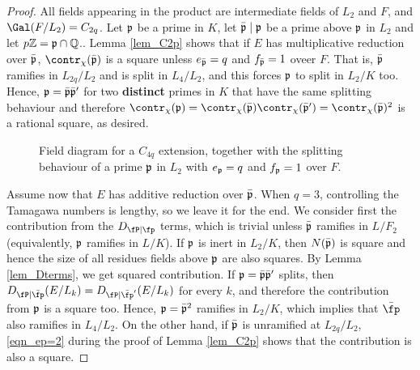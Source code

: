 \begin{proof}
    All fields appearing in the product are intermediate fields of $L_2$ and $F$, and $\Gal(F/L_2)=C_{2q}$. Let $\mathfrak{p}$ be a prime in $K$, let $\bar{\mathfrak{p}}\mid\mathfrak{p}$ be a prime above $\mathfrak{p}$ in $L_2$ and let $p\mathbb{Z}=\mathfrak{p}\cap\mathbb{Q}$.. Lemma \ref{lem_C2p} shows that if $E$ has multiplicative reduction over $\bar{\mathfrak{p}}$, $\contr_\chi(\bar\pp)$ is a square unless $e_{\bar{\mathfrak{p}}}=q$ and $f_{\bar{\mathfrak{p}}}=1$ oveer $F$. That is, $\bar{\mathfrak{p}}$ ramifies in $L_{2q}/L_2$ and is split in $L_4/L_2$, and this forces $\mathfrak{p}$ to split in $L_2/K$ too. Hence, $\mathfrak{p}=\bar{\mathfrak{p}}\bar{\mathfrak{p}}'$ for two \textbf{distinct} primes in $K$ that have the same splitting behaviour and therefore $\contr_\chi(\pp)=\contr_\chi(\bar\pp)\contr_\chi(\bar\pp')=\contr_\chi(\bar\pp)^2$ is a rational square, as desired.

    \begin{figure}[!ht]
        \centering
        \caption[short]{\centering Field diagram for a $C_{4q}$ extension, together with the splitting\\ behaviour of a prime $\mathfrak{p}$ in $L_2$ with $e_{\mathfrak{p}}=q$ and $f_{\mathfrak{p}}=1$ over $F$.}
    \end{figure}

    Assume now that $E$ has additive reduction over $\bar{\mathfrak{p}}$. When $q=3$, controlling the Tamagawa numbers is lengthy, so we leave it for the end. We consider first the contribution from the $D_{\fP\mid\fp}$ terms, which is trivial unless $\bar{\mathfrak{p}}$ ramifies in $L/F_2$ (equivalently, $\mathfrak{p}$ ramifies in $L/K$). If $\mathfrak{p}$ is inert in $L_2/K$, then $N(\bar{\mathfrak{p}})$ is square and hence the size of all residues fields above $\mathfrak{p}$ are also squares. By Lemma \ref{lem_Dterms}, we get squared contribution. If $\mathfrak{p}=\bar{\mathfrak{p}}\bar{\mathfrak{p}}'$ splits, then $D_{\fP\mid\bar\fp}(E/L_k)=D_{\fP\mid\bar\fp'}(E/L_k)$ for every $k$, and therefore the contribution from $\mathfrak{p}$ is a square too. Hence, $\mathfrak{p}=\bar{\mathfrak{p}}^2$ ramifies in $L_2/K$, which implies that $\bar\fp$ also ramifies in $L_4/L_2$. On the other hand, if $\bar{\mathfrak{p}}$ is unramified at $L_{2q}/L_2$, \eqref{eqn_ep=2} during the proof of Lemma \ref{lem_C2p} shows that the contribution is also a square. 


\end{proof}
